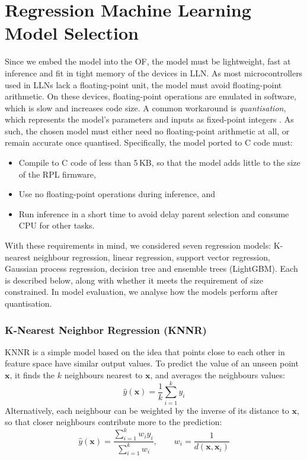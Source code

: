 \section{Regression Machine Learning Model Selection}
Since we embed the model into the OF, the model must be lightweight,
fast at inference and fit in tight memory of the devices in LLN.
As most microcontrollers used in LLNs lack a floating-point unit,
the model must avoid floating-point arithmetic. On these
devices, floating-point operations are emulated in software, which is
slow and increases code size. A common workaround is
\emph{quantisation}, which represents the model's parameters and
inputs as fixed-point integers
\cite{hasanpourSurveyQuantizationTechniques2025}. As such, the
chosen model must either need no floating-point arithmetic at all, or
remain accurate once quantised. Specifically, the model ported to C code must:
\begin{itemize}
    \item Compile to C code of less than 5\,KB, so that the model
        adds little to the size of the RPL firmware,
    \item Use no floating-point operations during inference, and
    \item Run inference in a short time to avoid delay parent
        selection and consume CPU for other tasks.
\end{itemize}

With these requirements in mind, we considered seven regression
models: K-nearest neighbour regression, linear regression, support
vector regression, Gaussian process regression, decision tree and
ensemble trees (LightGBM). Each is described below, along
with whether it meets
the requirement of size constrained. In model evaluation, we analyse
how the models perform after quantisation.

\subsubsection{K-Nearest Neighbor Regression (KNNR)}
KNNR is a simple model based on the idea that points close to each
other in feature space have similar output values. To predict the
value of an unseen point $\mathbf{x}$, it finds the $k$ neighbours nearest to
$\mathbf{x}$, and averages the neighbours values:
\begin{equation}
    \hat{y}(\mathbf{x}) = \frac{1}{k} \sum_{i=1}^{k} y_i
\end{equation}
Alternatively, each neighbour can be weighted by the inverse of its
distance to $\mathbf{x}$, so that closer neighbours contribute more
to the prediction:
\begin{equation}
    \hat{y}(\mathbf{x}) = \frac{\sum_{i=1}^{k} w_i y_i}{\sum_{i=1}^{k} w_i},
    \qquad w_i = \frac{1}{d(\mathbf{x}, \mathbf{x}_i)}
\end{equation}

